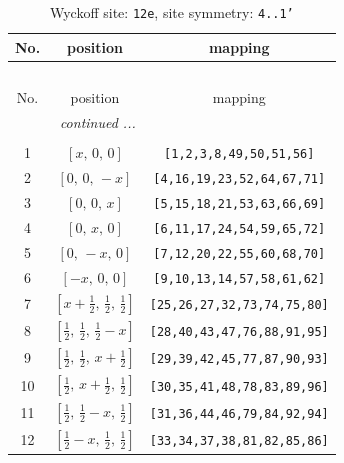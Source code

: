 \documentclass[fleqn,8pt]{jsarticle}
\begin{document}
\begin{longtable}{ccc}
\caption{Wyckoff site: {\tt 12e}, site symmetry: {\tt 4..1'}}
 \\
 \hline \hline
No. & position & mapping \\ \hline \endfirsthead

\multicolumn{2}{l}{\tablename\ \thetable{}} \\
 \hline \hline
No. & position & mapping \\ \hline \endhead

 \hline \hline
\multicolumn{2}{r}{\footnotesize\it continued ...} \\ \endfoot

 \hline \hline
\multicolumn{2}{r}{} \\ \endlastfoot

1 & $\left[ x,\, 0,\, 0 \right]$ & {\tt [1,2,3,8,49,50,51,56]} \\ \hline
2 & $\left[ 0,\, 0,\, - x \right]$ & {\tt [4,16,19,23,52,64,67,71]} \\ \hline
3 & $\left[ 0,\, 0,\, x \right]$ & {\tt [5,15,18,21,53,63,66,69]} \\ \hline
4 & $\left[ 0,\, x,\, 0 \right]$ & {\tt [6,11,17,24,54,59,65,72]} \\ \hline
5 & $\left[ 0,\, - x,\, 0 \right]$ & {\tt [7,12,20,22,55,60,68,70]} \\ \hline
6 & $\left[ - x,\, 0,\, 0 \right]$ & {\tt [9,10,13,14,57,58,61,62]} \\ \hline
7 & $\left[ x + \frac{1}{2},\, \frac{1}{2},\, \frac{1}{2} \right]$ & {\tt [25,26,27,32,73,74,75,80]} \\ \hline
8 & $\left[ \frac{1}{2},\, \frac{1}{2},\, \frac{1}{2} - x \right]$ & {\tt [28,40,43,47,76,88,91,95]} \\ \hline
9 & $\left[ \frac{1}{2},\, \frac{1}{2},\, x + \frac{1}{2} \right]$ & {\tt [29,39,42,45,77,87,90,93]} \\ \hline
10 & $\left[ \frac{1}{2},\, x + \frac{1}{2},\, \frac{1}{2} \right]$ & {\tt [30,35,41,48,78,83,89,96]} \\ \hline
11 & $\left[ \frac{1}{2},\, \frac{1}{2} - x,\, \frac{1}{2} \right]$ & {\tt [31,36,44,46,79,84,92,94]} \\ \hline
12 & $\left[ \frac{1}{2} - x,\, \frac{1}{2},\, \frac{1}{2} \right]$ & {\tt [33,34,37,38,81,82,85,86]} \\
\end{longtable}
\renewcommand{\arraystretch}{1.2}
\end{document}

